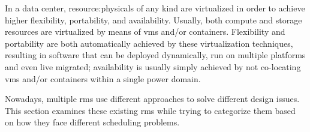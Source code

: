 In a data center, \glspl{resource:physical} of any kind are virtualized in order to achieve higher flexibility, portability, and availability.
Usually, both compute and storage resources are virtualized by means of \glspl{vm} and/or containers.
Flexibility and portability are both automatically achieved by these virtualization techniques, resulting in software that can be deployed dynamically, run on multiple platforms and even live migrated; availability is usually simply achieved by not co-locating \glspl{vm} and/or containers within a single power domain.

Nowadays, multiple \glspl{rm} use different approaches to solve different design issues.
This section examines these existing \glspl{rm} while trying to categorize them based on how they face different scheduling problems.